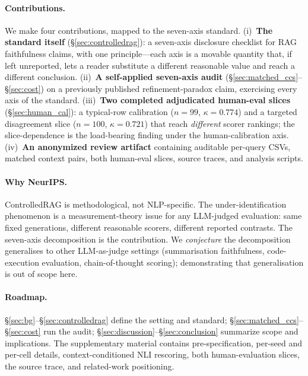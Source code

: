 \paragraph{Contributions.} We make four contributions, mapped to
the seven-axis standard.
(i)~\textbf{The standard itself} (\S\ref{sec:controlledrag}): a
seven-axis disclosure checklist for RAG faithfulness claims, with
one principle---each axis is a movable quantity that, if left
unreported, lets a reader substitute a different reasonable value
and reach a different conclusion.
(ii)~\textbf{A self-applied seven-axis audit}
(\S\ref{sec:matched_ccs}--\S\ref{sec:cost}) on a previously
published refinement-paradox claim, exercising every axis of the
standard.
(iii)~\textbf{Two completed adjudicated human-eval slices}
(\S\ref{sec:human_cal}): a typical-row calibration
($n{=}99$, $\kappa{=}0.774$) and a targeted disagreement slice
($n{=}100$, $\kappa{=}0.721$) that reach \emph{different} scorer
rankings; the slice-dependence is the load-bearing finding under
the human-calibration axis.
(iv)~\textbf{An anonymized review artifact} containing auditable
per-query CSVs, matched context pairs, both human-eval slices,
source traces, and analysis scripts.

\paragraph{Why NeurIPS.} ControlledRAG is methodological, not
NLP-specific. The under-identification phenomenon is a
measurement-theory issue for any LLM-judged evaluation: same fixed
generations, different reasonable scorers, different reported
contrasts. The seven-axis decomposition is the contribution. We
\emph{conjecture} the decomposition generalises to other
LLM-as-judge settings (summarisation faithfulness, code-execution
evaluation, chain-of-thought scoring); demonstrating that
generalisation is out of scope here.

\paragraph{Roadmap.} \S\ref{sec:bg}--\S\ref{sec:controlledrag}
define the setting and standard; \S\ref{sec:matched_ccs}--\S\ref{sec:cost}
run the audit; \S\ref{sec:discussion}--\S\ref{sec:conclusion}
summarize scope and implications. The supplementary material contains
pre-specification, per-seed and per-cell details, context-conditioned
NLI rescoring, both human-evaluation slices, the source trace, and
related-work positioning.

